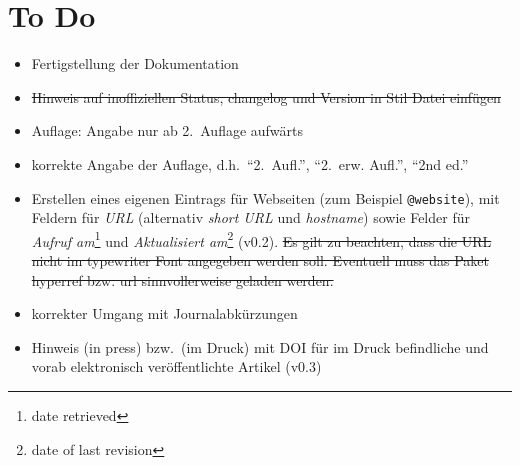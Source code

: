 \documentclass[a4paper,10pt]{scrartcl}
\begin{document}
\section{To Do}
\begin{itemize}
 \item Fertigstellung der Dokumentation
 \item \sout{Hinweis auf inoffiziellen Status, changelog und Version in Stil
Datei
einfügen}
 \item Auflage: Angabe nur ab 2.~Auflage aufwärts
 \item korrekte Angabe der Auflage, d.h.\ "`2.~Aufl."', "`2.~erw. Aufl."', "`2nd
ed."'
 \item Erstellen eines eigenen Eintrags für Webseiten (zum Beispiel
\verb|@website|), mit Feldern für \emph{URL} (alternativ \emph{short URL} und
\emph{hostname}) sowie Felder für \emph{Aufruf am}\footnote{date retrieved} und
\emph{Aktualisiert am}\footnote{date of last revision} (v0.2). \sout{Es gilt zu
beachten,
dass die URL nicht im typewriter Font angegeben werden soll. Eventuell muss das
Paket hyperref bzw. url sinnvollerweise geladen werden.}
\item korrekter Umgang mit Journalabkürzungen
\item Hinweis (in press) bzw.\ (im Druck) mit DOI f\"ur im Druck befindliche und
vorab elektronisch ver\"offentlichte Artikel (v0.3)
\end{itemize}


\newpage
\label{sec:Literaturverzeichnis}

\nocite{*}

%
\end{document}
